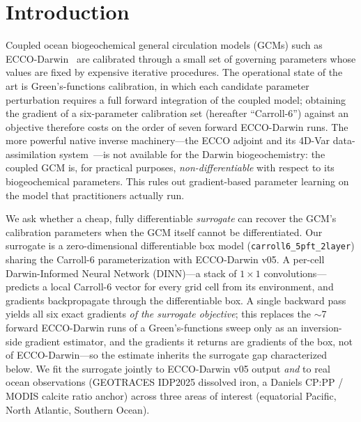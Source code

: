 \documentclass[11pt]{article}
\begin{document}
\section{Introduction}
\label{sec:intro}

Coupled ocean biogeochemical general circulation models (GCMs) such as
ECCO-Darwin~\cite{carroll2022} are calibrated through a small set of governing
parameters whose values are fixed by expensive iterative procedures. The
operational state of the art is Green's-functions calibration, in which each
candidate parameter perturbation requires a full forward integration of the
coupled model; obtaining the gradient of a six-parameter calibration set
(hereafter ``Carroll-6'') against an objective therefore costs on the order of
seven forward ECCO-Darwin runs. The more powerful native inverse machinery---the
ECCO adjoint and its 4D-Var data-assimilation system~\cite{heimbach2015,
menemenlis2005}---is not available for the Darwin biogeochemistry: the coupled
GCM is, for practical purposes, \emph{non-differentiable} with respect to its
biogeochemical parameters. This rules out gradient-based parameter learning on
the model that practitioners actually run.

We ask whether a cheap, fully differentiable \emph{surrogate} can recover the
GCM's calibration parameters when the GCM itself cannot be differentiated. Our
surrogate is a zero-dimensional differentiable box model
(\texttt{carroll6\_5pft\_2layer}) sharing the Carroll-6 parameterization with
ECCO-Darwin v05. A per-cell Darwin-Informed Neural Network (DINN)---a stack of
$1{\times}1$ convolutions---predicts a local Carroll-6 vector for every grid
cell from its environment, and gradients backpropagate through the
differentiable box. A single backward pass yields all six exact gradients
\emph{of the surrogate objective}; this replaces the $\sim$7 forward
ECCO-Darwin runs of a Green's-functions sweep only as an inversion-side gradient
estimator, and the gradients it returns are gradients of the box, not of
ECCO-Darwin---so the estimate inherits the surrogate gap characterized below.
We fit the surrogate jointly to ECCO-Darwin v05 output \emph{and} to real
ocean observations (GEOTRACES IDP2025 dissolved iron, a Daniels CP:PP / MODIS
calcite ratio anchor) across three areas of interest (equatorial Pacific, North
Atlantic, Southern Ocean).
\end{document}
